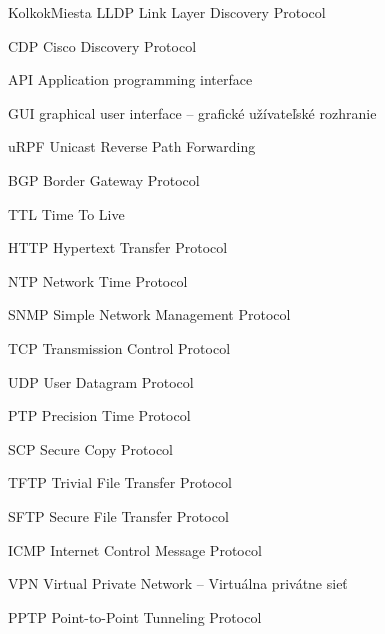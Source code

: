 \begin{seznamzkratek}{KolkokMiesta}
	{LLDP} %
	{Link Layer Discovery Protocol} %
	
	{CDP} %
	{Cisco Discovery Protocol} %

	{API} %
	{Application programming interface} %
	
	{GUI} %
	{graphical user interface -- grafické užívateľské rozhranie} %
	
	{uRPF} %
	{Unicast Reverse Path Forwarding} %
	
	{BGP} %
	{Border Gateway Protocol} %
	
	{TTL} %
	{Time To Live} %
	
	{HTTP} %
	{Hypertext Transfer Protocol} %
	
	{NTP} %
	{Network Time Protocol} %
	
	{SNMP} %
	{Simple Network Management Protocol} %
	
	{TCP} %
	{Transmission Control Protocol} %

	{UDP} %
	{User Datagram Protocol} %
	
	{PTP} %
	{Precision Time Protocol} %

	{SCP} %
	{Secure Copy Protocol} %
	
	{TFTP} %
	{Trivial File Transfer Protocol} %
	
	{SFTP} %
	{Secure File Transfer Protocol} %
	
	{ICMP} %
	{Internet Control Message Protocol} %
	
	{VPN} %
	{Virtual Private Network -- Virtuálna privátne sieť} %
	
	{PPTP} %
	{Point-to-Point Tunneling Protocol} %
	

\end{seznamzkratek}
